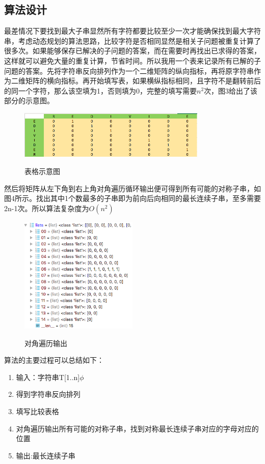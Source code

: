 \documentclass[UTF8]{ctexart}
\begin{document}
\subsection{算法设计}
最差情况下要找到最大子串显然所有字符都要比较至少一次才能确保找到最大字符串，考虑动态规划的算法思路，比较字符是否相同显然是相关子问题被重复计算了很多次。如果能够保存已解决的子问题的答案，而在需要时再找出已求得的答案，这样就可以避免大量的重复计算，节省时间。所以我用一个表来记录所有已解的子问题的答案。先将字符串反向排列作为一个二维矩阵的纵向指标，再将原字符串作为二维矩阵的横向指标。再开始填写表，如果横纵指标相同，且字符不是翻转前后的同一个字符，那么该空填为1，否则填为0，完整的填写需要$n^2$次，图3给出了该部分的示意图。

\begin{figure}[H]
  \centering
  \label{fig:Per6A}\includegraphics[width=0.8\textwidth]{lcs.png}\
  \caption{表格示意图}
  \label{fig:oscil}
\end{figure}

然后将矩阵从左下角到右上角对角遍历循环输出便可得到所有可能的对称子串，如图4所示。找出其中1个数最多的子串即为前向后向相同的最长连续子串，至多需要2n-1次。所以算法复杂度为$O(n^2)$

\begin{figure}[H]
  \centering
  \label{fig:Per6A}\includegraphics[width=0.5\textwidth]{list.png}\
  \caption{对角遍历输出}
  \label{fig:oscil}
\end{figure}
\vspace{3mm}

算法的主要过程可以总结如下：

\begin{enumerate}
	\item 输入：字符串T[1..n]$\phi$
	\item 得到字符串反向排列
	\item 填写比较表格
  \item 对角遍历输出所有可能的对称子串，找到对称最长连续子串对应的字母对应的位置
	\item 输出:最长连续子串
\end{enumerate}
\end{document}
